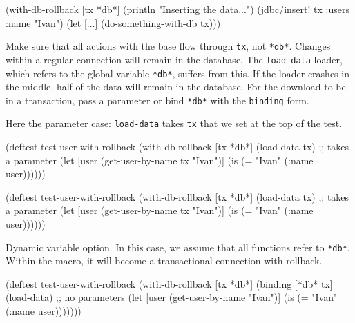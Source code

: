 \else

\begin{english}
  \begin{clojure}
(with-db-rollback [tx *db*]
  (println "Inserting the data...")
  (jdbc/insert! tx :users {:name "Ivan"})
  (let [...]
    (do-something-with-db tx)))
  \end{clojure}
\end{english}

\fi

Make sure that all actions with the base flow through \verb|tx|, not \verb|*db*|. Changes within a regular connection will remain in the database. The \verb|load-data| loader, which refers to the global variable \verb|*db*|, suffers from this. If the loader crashes in the middle, half of the data will remain in the database. For the download to be in a transaction, pass a parameter or bind \verb|*db*| with the \verb|binding| form.

Here the parameter case: \verb|load-data| takes \verb|tx| that we set at the top of the test.

\ifnarrow

\begin{english}
  \begin{clojure}
(deftest test-user-with-rollback
  (with-db-rollback [tx *db*]
    (load-data tx) ;; takes a parameter
    (let [user
          (get-user-by-name tx "Ivan")]
      (is (= "Ivan" (:name user))))))
  \end{clojure}
\end{english}

\else

\begin{english}
  \begin{clojure}
(deftest test-user-with-rollback
  (with-db-rollback [tx *db*]
    (load-data tx) ;; takes a parameter
    (let [user (get-user-by-name tx "Ivan")]
      (is (= "Ivan" (:name user))))))
  \end{clojure}
\end{english}

\fi


Dynamic variable option. In this case, we assume that all functions refer to \verb|*db*|. Within the macro, it will become a transactional connection with rollback.

\ifnarrow

\begin{english}
  \begin{clojure}
(deftest test-user-with-rollback
  (with-db-rollback [tx *db*]
    (binding [*db* tx]
      (load-data) ;; no parameters
      (let [user
            (get-user-by-name "Ivan")]
        (is (= "Ivan" (:name user)))))))
  \end{clojure}
\end{english}


